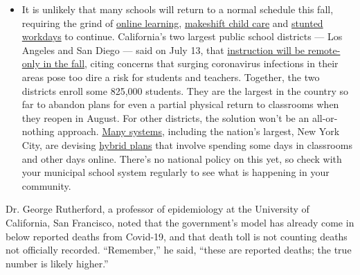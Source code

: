 \begin{itemize}
  \begin{itemize}
  \tightlist
  \item
    It is unlikely that many schools will return to a normal schedule
    this fall, requiring the grind of
    \href{https://www.nytimes.com/2020/06/05/us/coronavirus-education-lost-learning.html?action=click\&pgtype=Article\&state=default\&region=MAIN_CONTENT_3\&context=storylines_faq}{online
    learning},
    \href{https://www.nytimes.com/2020/05/29/us/coronavirus-child-care-centers.html?action=click\&pgtype=Article\&state=default\&region=MAIN_CONTENT_3\&context=storylines_faq}{makeshift
    child care} and
    \href{https://www.nytimes.com/2020/06/03/business/economy/coronavirus-working-women.html?action=click\&pgtype=Article\&state=default\&region=MAIN_CONTENT_3\&context=storylines_faq}{stunted
    workdays} to continue. California's two largest public school
    districts --- Los Angeles and San Diego --- said on July 13, that
    \href{https://www.nytimes.com/2020/07/13/us/lausd-san-diego-school-reopening.html?action=click\&pgtype=Article\&state=default\&region=MAIN_CONTENT_3\&context=storylines_faq}{instruction
    will be remote-only in the fall}, citing concerns that surging
    coronavirus infections in their areas pose too dire a risk for
    students and teachers. Together, the two districts enroll some
    825,000 students. They are the largest in the country so far to
    abandon plans for even a partial physical return to classrooms when
    they reopen in August. For other districts, the solution won't be an
    all-or-nothing approach.
    \href{https://bioethics.jhu.edu/research-and-outreach/projects/eschool-initiative/school-policy-tracker/}{Many
    systems}, including the nation's largest, New York City, are
    devising
    \href{https://www.nytimes.com/2020/06/26/us/coronavirus-schools-reopen-fall.html?action=click\&pgtype=Article\&state=default\&region=MAIN_CONTENT_3\&context=storylines_faq}{hybrid
    plans} that involve spending some days in classrooms and other days
    online. There's no national policy on this yet, so check with your
    municipal school system regularly to see what is happening in your
    community.
  \end{itemize}
\end{itemize}

Dr. George Rutherford, a professor of epidemiology at the University of
California, San Francisco, noted that the government's model has already
come in below reported deaths from Covid-19, and that death toll is not
counting deaths not officially recorded. ``Remember,'' he said, ``these
are reported deaths; the true number is likely higher.''

